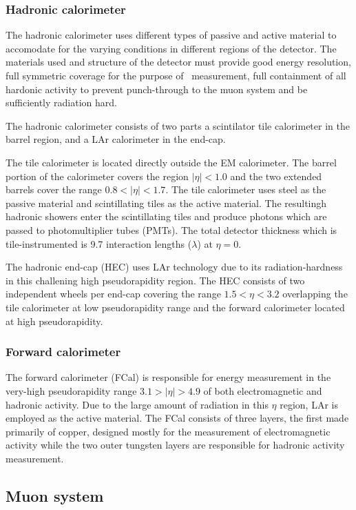 \subsubsection{Hadronic calorimeter}
The hadronic calorimeter uses different types of passive and active material to accomodate for the varying conditions in different regions of the detector. The materials used and structure of the detector must provide good energy resolution, full symmetric coverage for the purpose of \met\ measurement,  full containment of all hardonic activity to prevent punch-through to the muon system and be sufficiently radiation hard.

The hadronic calorimeter consists of two parts a scintilator tile calorimeter in the barrel region, and a LAr calorimeter in the end-cap.

The tile calorimeter is located directly outside the EM calorimeter. The barrel portion of the calorimeter covers the region $|\eta|<1.0$ and the two extended barrels cover the range $0.8<|\eta|<1.7$. The tile calorimeter uses steel as the passive material and scintillating tiles as the active material. The resultingh hadronic showers enter the scintillating tiles and produce photons which are passed to photomultiplier tubes (PMTs). The total detector thickness which is tile-instrumented is 9.7 interaction lengths ($\lambda$) at $\eta=0$.

The hadronic end-cap (HEC) uses LAr technology due to its radiation-hardness in this challening high pseudorapidity region. The HEC consists of two independent wheels per end-cap covering the range $1.5<\eta<3.2$ overlapping the tile calorimeter at low pseudorapidity range and the forward calorimeter located at high pseudorapidity.

\subsubsection{Forward calorimeter}

The forward calorimeter (FCal) is responsible for energy measurement in the very-high pseudorapidity range $3.1>|\eta|>4.9$ of both electromagnetic and hadronic activity. Due to the large amount of radiation in this $\eta$ region, LAr is employed as the active material. The FCal consists of three layers, the first made primarily of copper, designed mostly for the measurement of electromagnetic activity while the two outer tungsten layers are responsible for hadronic activity measurement.

\subsection{Muon system}

